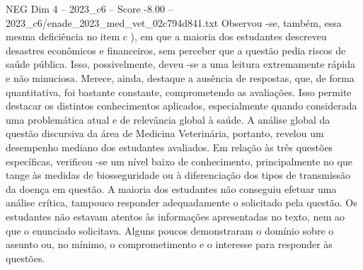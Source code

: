 \begin{textsample}{NEG Dim 4 – 2023\_c6 – Score -8.00 – 2023\_c6/enade\_2023\_med\_vet\_02c794d841.txt}
Observou -se, também, essa mesma deficiência no item c ), em que a maioria dos estudantes descreveu desastres econômicos e financeiros, sem perceber que a questão pedia riscos de saúde pública.
Isso, possivelmente, deveu -se a uma leitura extremamente rápida e não minuciosa.
Merece, ainda, destaque a ausência de respostas, que, de forma quantitativa, foi bastante constante, comprometendo as avaliações.
Isso permite destacar os distintos conhecimentos aplicados, especialmente quando considerada uma problemática atual e de relevância global à saúde.
A análise global da questão discursiva da área de Medicina Veterinária, portanto, revelou um desempenho mediano dos estudantes avaliados.
Em relação às três questões específicas, verificou -se um nível baixo de conhecimento, principalmente no que tange às medidas de biosseguridade ou à diferenciação dos tipos de transmissão da doença em questão.
A maioria dos estudantes não conseguiu efetuar uma análise crítica, tampouco responder adequadamente o solicitado pela questão.
Os estudantes não estavam atentos às informações apresentadas no texto, nem ao que o enunciado solicitava.
Alguns poucos demonstraram o domínio sobre o assunto ou, no mínimo, o comprometimento e o interesse para responder às questões.

\end{textsample}

